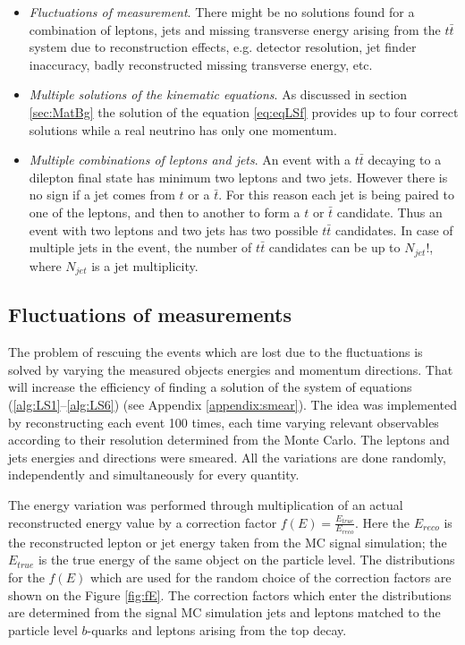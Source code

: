 \begin{itemize}
 \item \textit{Fluctuations of measurement}. There might be no solutions found for a combination
 of leptons, jets and missing transverse energy arising from the $t\bar{t}$ system due to reconstruction effects, e.g. detector resolution,
 jet finder inaccuracy, badly reconstructed missing transverse energy, etc.
 \item \textit{Multiple solutions of the kinematic equations}. As discussed in section \ref{sec:MatBg} the solution of the equation \ref{eq:eqLSf}
 provides up to four correct solutions while a real neutrino has only one momentum.
 \item \textit{Multiple combinations of leptons and jets}. An event with a $t\bar{t}$ decaying to a dilepton final state has minimum two leptons and two
 jets. However there is no sign if a jet comes from $t$ or a $\bar{t}$. For this reason each jet is being paired to one of the leptons, and then to another
 to form a $t$ or $\bar{t}$ candidate. Thus an event with two leptons and two jets has two possible $t\bar{t}$ candidates. In case of multiple jets
 in the event, the number of $t\bar{t}$ candidates can be up to $N_{jet}!$, where $N_{jet}$ is a jet multiplicity.
\end{itemize}


\subsection{Fluctuations of measurements}

The problem of rescuing the events which are lost due to the fluctuations is solved by varying the measured objects energies and
momentum directions. That will increase the efficiency of finding a solution of the system of equations (\ref{alg:LS1}--\ref{alg:LS6}) (see Appendix \ref{appendix:smear}). 
The idea was implemented by reconstructing each event 100 times, each time varying relevant observables according to their resolution determined from the Monte Carlo.
The leptons and jets energies and directions were smeared. All the variations are done randomly, independently and simultaneously for every quantity.

The energy variation was performed through multiplication of an actual reconstructed energy value
by a correction factor $f(E) = \frac{E_{true}}{E_{reco}}$. Here the $E_{reco}$ is the reconstructed lepton or jet energy taken from the MC signal simulation;
the $E_{true}$ is the true energy of the same object on the particle level. The distributions for the $f(E)$ which are used for the random choice
of the correction factors are shown on the Figure \ref{fig:fE}. The correction factors which enter the distributions are determined from the signal MC simulation jets and 
leptons matched to the particle level $b$-quarks and leptons arising from the top decay. 

